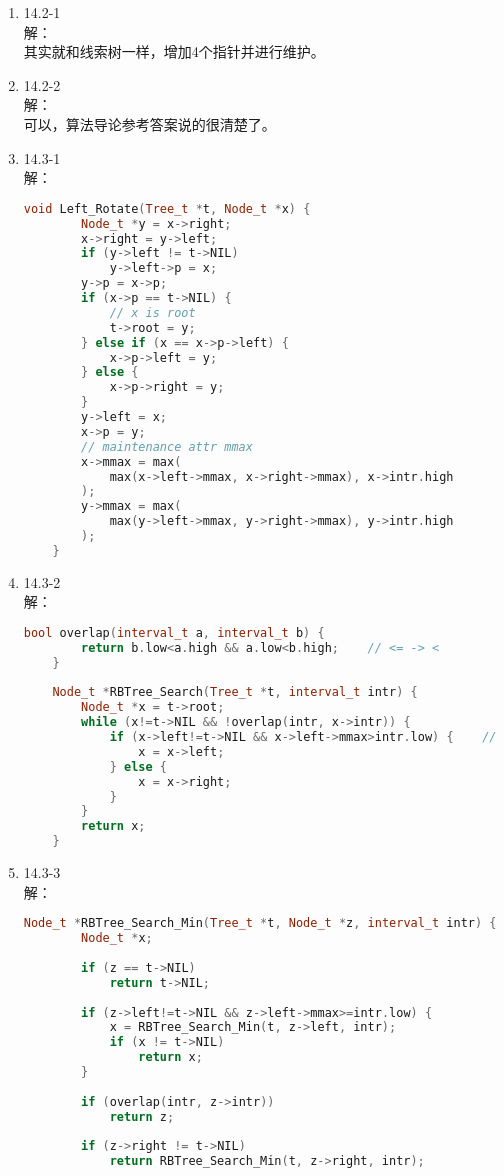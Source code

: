 \documentclass[UTF8]{ctexart}
\begin{document}
\begin{enumerate}
	\item 14.2-1 \\
	解：\\
		其实就和线索树一样，增加4个指针并进行维护。
		
	\item 14.2-2 \\
	解：\\
		可以，算法导论参考答案说的很清楚了。
		
	\item 14.3-1 \\
	解：
	\begin{lstlisting}[language=C++]
	void Left_Rotate(Tree_t *t, Node_t *x) {
		Node_t *y = x->right;
		x->right = y->left;
		if (y->left != t->NIL)
			y->left->p = x;
		y->p = x->p;
		if (x->p == t->NIL) {
			// x is root
			t->root = y;	
		} else if (x == x->p->left) {
			x->p->left = y;
		} else {
			x->p->right = y;
		}
		y->left = x;
		x->p = y;
		// maintenance attr mmax
		x->mmax = max(
			max(x->left->mmax, x->right->mmax), x->intr.high
		);
		y->mmax = max(
			max(y->left->mmax, y->right->mmax), y->intr.high
		);
	}
	\end{lstlisting}
	
	\item 14.3-2 \\
	解：
	\begin{lstlisting}[language=c++]
	bool overlap(interval_t a, interval_t b) {
		return b.low<a.high && a.low<b.high;	// <= -> <
	}
	
	Node_t *RBTree_Search(Tree_t *t, interval_t intr) {
		Node_t *x = t->root;
		while (x!=t->NIL && !overlap(intr, x->intr)) {
			if (x->left!=t->NIL && x->left->mmax>intr.low) {	// >= -> >
				x = x->left;
			} else {
				x = x->right;
			}
		}
		return x;
	}
	\end{lstlisting}
	
	\item 14.3-3 \\
	解：
	\begin{lstlisting}[language=c++]
	Node_t *RBTree_Search_Min(Tree_t *t, Node_t *z, interval_t intr) {
		Node_t *x;	
		
		if (z == t->NIL)
			return t->NIL;
		
		if (z->left!=t->NIL && z->left->mmax>=intr.low) {
			x = RBTree_Search_Min(t, z->left, intr);
			if (x != t->NIL)
				return x;
		}
		
		if (overlap(intr, z->intr))
			return z;
		
		if (z->right != t->NIL)
			return RBTree_Search_Min(t, z->right, intr);
		

\end{lstlisting}
\end{enumerate}
\end{document}

